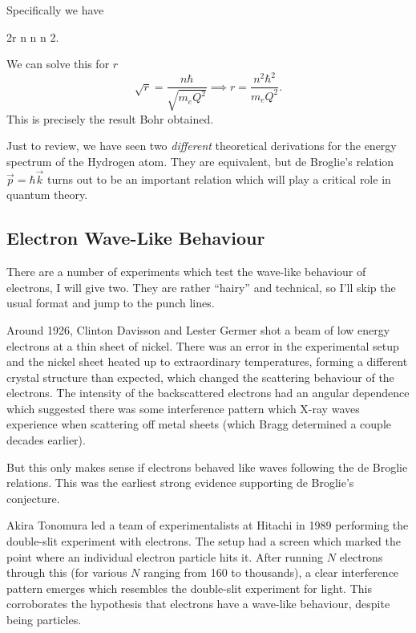Specifically we have
\begin{calculation}
2\pi r
n 
n 
n 2\pi\hbar{}.
\end{calculation}
We can solve this for $r$
\begin{equation}
  \sqrt{r} = \frac{n\hbar}{\sqrt{m_{e}Q^{2}}}\implies
r = \frac{n^{2}\hbar^{2}}{m_{e}Q^{2}}.
\end{equation}
This is precisely the result Bohr obtained.

\begin{remark}
Just to review, we have seen two \emph{different} theoretical
derivations for the energy spectrum of the Hydrogen atom. They are
equivalent, but de Broglie's relation $\vec{p}=\hbar\vec{k}$ turns out
to be an important relation which will play a critical role in quantum
theory. 
\end{remark}

\subsection{Electron Wave-Like Behaviour}

\M
There are a number of experiments which test the wave-like behaviour of
electrons, I will give two. They are rather ``hairy'' and technical, so
I'll skip the usual format and jump to the punch lines.

Around 1926,
Clinton Davisson and Lester Germer shot a beam of low energy electrons
at a thin sheet of nickel. There was an error in the experimental setup
and the nickel sheet heated up to extraordinary temperatures, forming a
different crystal structure than expected, which changed the scattering
behaviour of the electrons. The intensity of the backscattered electrons
had an angular dependence which suggested there was some interference
pattern which X-ray waves experience when scattering off metal sheets
(which Bragg determined a couple decades earlier).

But this only makes sense if electrons behaved like waves following the
de Broglie relations. This was the earliest strong evidence supporting
de Broglie's conjecture.

Akira Tonomura led a team of experimentalists at Hitachi in 1989
performing the double-slit experiment with electrons. The setup had a
screen which marked the point where an individual electron particle hits
it. After running $N$ electrons through this (for various $N$ ranging
from 160 to thousands), a clear interference pattern emerges which
resembles the double-slit experiment for light. This corroborates the
hypothesis that electrons have a wave-like behaviour, despite being
particles. 
